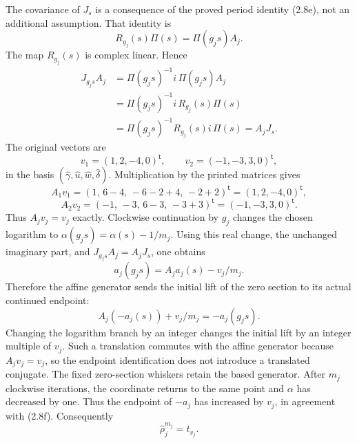 The covariance of \(J_s\) is a consequence of the proved period
identity (2.8e), not an additional assumption.  That identity is
\[
 R_{g_j}(s)\Pi(s)=\Pi(g_js)A_j.
\]
The map \(R_{g_j}(s)\) is complex linear.  Hence
\[
 \begin{split}
 J_{g_js}A_j
 &=\Pi(g_js)^{-1}i\,\Pi(g_js)A_j\\
 &=\Pi(g_js)^{-1}i\,R_{g_j}(s)\Pi(s)\\
 &=\Pi(g_js)^{-1}R_{g_j}(s)i\,\Pi(s)
 =A_jJ_s.
 \end{split}
\]
The original vectors are
\[
 v_1=(1,2,-4,0)^{\mathsf t},\qquad
 v_2=(-1,-3,3,0)^{\mathsf t},
\]
in the basis
\((\widehat\gamma,\widehat u,\widehat w,\widehat\delta)\).
Multiplication by the printed matrices gives
\[
 A_1v_1=(1,\,6-4,\,-6-2+4,\,-2+2)^{\mathsf t}
        =(1,2,-4,0)^{\mathsf t},
\]
\[
 A_2v_2=(-1,\,-3,\,6-3,\,-3+3)^{\mathsf t}
        =(-1,-3,3,0)^{\mathsf t}.
\]
Thus \(A_jv_j=v_j\) exactly.  Clockwise continuation by \(g_j\)
changes the chosen logarithm to
\(\alpha(g_js)=\alpha(s)-1/m_j\).  Using this real change, the
unchanged imaginary part, and \(J_{g_js}A_j=A_jJ_s\), one obtains
\[
 a_j(g_js)=A_ja_j(s)-v_j/m_j.
\]
Therefore the affine generator sends the initial lift of the
zero section to its actual continued endpoint:
\[
 A_j(-a_j(s))+v_j/m_j=-a_j(g_js).
\]
Changing the logarithm branch by an integer changes the initial
lift by an integer multiple of \(v_j\).  Such a translation
commutes with the affine generator because \(A_jv_j=v_j\), so the
endpoint identification does not introduce a translated conjugate.
The fixed zero-section whiskers retain the based generator.
After \(m_j\) clockwise iterations, the coordinate returns to the
same point and \(\alpha\) has decreased by one.  Thus the endpoint
of \(-a_j\) has increased by \(v_j\), in agreement with (2.8f).
Consequently
\[
 \widehat\rho_j^{m_j}=t_{v_j}.
 \tag{5.23b}
\]
